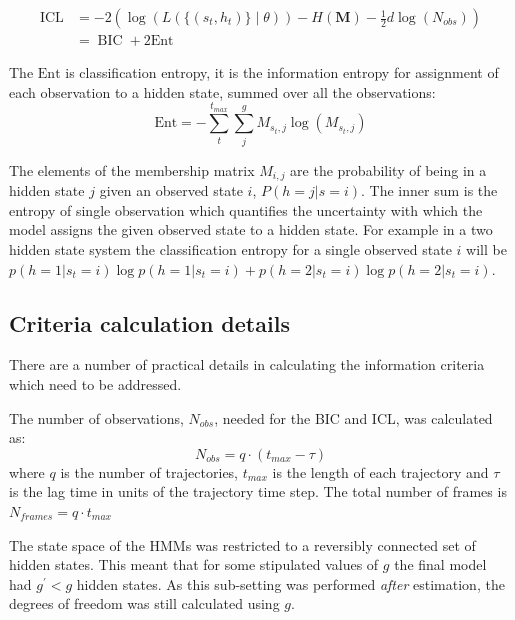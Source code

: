 \begin{equation}\label{eqn:icl}
\begin{split}
        \operatorname{ICL} &= -2\left(\log{\left(L\left(\{(s_t, h_{t})\}\middle|\theta\right)\right)} - H\left(\mathbf{M}\right) - \frac{1}{2}d\log{\left(N_{obs}\right)}\right)     \\
        & = \operatorname{BIC} + 2\mathrm{Ent}
\end{split}
\end{equation}

The $\mathrm{Ent}$ is classification entropy, it is the information entropy for assignment of each observation to a hidden state, summed over all the observations: 
\begin{equation}
    \mathrm{Ent} = -\sum_{t}^{t_{max}} \sum_{j}^{g} M_{s_{t}, j}\log{\left(M_{s_{t}, j}\right)}
\end{equation}

The elements of the membership matrix  $M_{i,j}$ are the probability of being in a hidden state $j$ given an observed state $i$, $P(h=j|s=i)$. The inner sum is the entropy of single observation which quantifies the uncertainty with which the model assigns the given observed state to a hidden state. For example in a two hidden state system the classification entropy for a single observed state $i$ will be $p(h=1|s_t=i)\log{p(h=1|s_t=i)} + p(h=2|s_t=i)\log{p(h=2|s_t=i)}$. 



\subsection{Criteria calculation details}
There are a number of practical details in calculating the information criteria which need to be addressed. 

The number of observations, $N_{obs}$, needed for the BIC and ICL, was calculated as: 
\begin{equation}
    N_{obs} = q\cdot(t_{max} - \tau)
\end{equation}
where $q$ is the number of trajectories, $t_{max}$ is the length of each trajectory and $\tau$ is the lag time in units of the trajectory time step. The total number of frames is $N_{frames} = q\cdot t_{max}$

The state space of the HMMs was restricted to a reversibly connected set of  hidden states. This meant that for some stipulated values of $g$ the final model had $g^{\prime}<g$ hidden states. As this sub-setting was performed \emph{after} estimation, the degrees of freedom was still calculated using $g$. 

